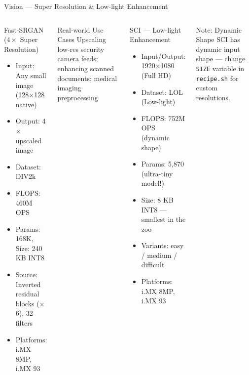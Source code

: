 \documentclass[aspectratio=169]{beamer}
\begin{document}
\begin{frame}{Vision — Super Resolution \& Low-light Enhancement}
  \begin{columns}[T]
      \begin{block}{Fast-SRGAN ($4\times$ Super Resolution)}
        \begin{itemize}\scriptsize
          \item Input: Any small image (128$\times$128 native)
          \item Output: 4$\times$ upscaled image
          \item Dataset: DIV2k
          \item FLOPS: \alert{460M OPS}
          \item Params: \alert{168K}, Size: \alert{240 KB INT8}
          \item Source: Inverted residual blocks ($\times$6), 32 filters
          \item Platforms: i.MX 8MP, i.MX 93
        \end{itemize}
      \end{block}
      \vspace{4pt}
      \begin{alertblock}{Real-world Use Cases}
        \scriptsize Upscaling low-res security camera feeds; enhancing scanned documents; medical imaging preprocessing
      \end{alertblock}
      \begin{block}{SCI — Low-light Enhancement}
        \begin{itemize}\scriptsize
          \item Input/Output: 1920$\times$1080 (Full HD)
          \item Dataset: LOL (Low-light)
          \item FLOPS: 752M OPS (dynamic shape)
          \item Params: \alert{5,870} (ultra-tiny model!)
          \item Size: \alert{8 KB INT8} — smallest in the zoo
          \item Variants: easy / medium / difficult
          \item Platforms: i.MX 8MP, i.MX 93
        \end{itemize}
      \end{block}
      \vspace{4pt}
      \begin{alertblock}{Note: Dynamic Shape}
        \scriptsize SCI has dynamic input shape — change \texttt{SIZE} variable in \texttt{recipe.sh} for custom resolutions.
      \end{alertblock}
  \end{columns}
\end{frame}
\end{document}
